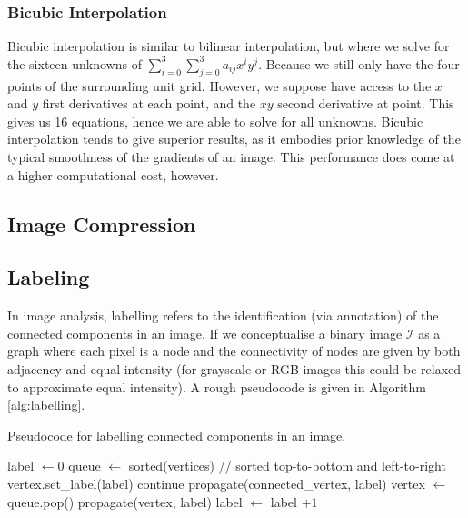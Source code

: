 \documentclass[11pt]{amsart}
\begin{document}
\subsubsection{Bicubic Interpolation}

Bicubic interpolation is similar to bilinear interpolation, but where we solve for the sixteen unknowns of $\sum_{i=0}^3\sum_{j=0}^3a_{ij}x^iy^j$. Because we still only have the four points of the surrounding unit grid. However, we suppose have access to the $x$ and $y$ first derivatives at each point, and the $xy$ second derivative at point. This gives us 16 equations, hence we are able to solve for all unknowns. Bicubic interpolation tends to give superior results, as it embodies prior knowledge of the typical smoothness of the gradients of an image. This performance does come at a higher computational cost, however.

\subsection{Image Compression}

\subsection{Labeling}

In image analysis, labelling refers to the identification (via annotation) of the connected components in an image. If we conceptualise a binary image $\mathcal{I}$ as a graph where each pixel is a node and the connectivity of nodes are given by both adjacency and equal intensity (for grayscale or RGB images this could be relaxed to approximate equal intensity). A rough pseudocode is given in Algorithm \ref{alg:labelling}.

\begin{algorithm}
\caption{Pseudocode for labelling connected components in an image.}
\label{alg:labelling}
\begin{algorithmic}[1]
\State label $\leftarrow 0$
\State queue $\leftarrow$ sorted(vertices) // sorted top-to-bottom and left-to-right
\State vertex.set\_label(label)
\State continue
\Else
\State propagate(connected\_vertex, label)
\EndIf
\EndFor
\EndProcedure
{}
\State vertex $\leftarrow$ queue.pop()
\State propagate(vertex, label)
\State label $\leftarrow$ label $+ 1$
\EndWhile
\end{algorithmic}
\end{algorithm}
\end{document}
